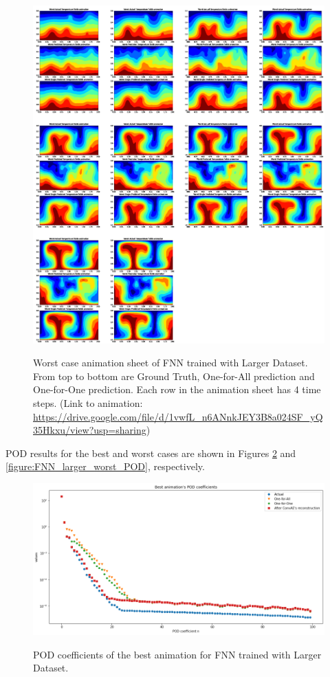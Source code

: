 \begin{figure}[H]
    \centering
    \caption{Worst case animation sheet of FNN trained with Larger Dataset. From top to bottom are Ground Truth, One-for-All prediction and One-for-One prediction. Each row in the animation sheet has 4 time steps. (Link to animation: \url{https://drive.google.com/file/d/1vwfL_n6ANnkJEY3B8a024SF_yQ35Hkxu/view?usp=sharing})}
    \includegraphics[scale=0.23]{figures/mantle_convection_images/larger_dataset/FNN_Worst_GIF_sheet.png}
    \label{figure:FNN_larger_worst_gif}
\end{figure}

POD results for the best and worst cases are shown in Figures \ref{figure:FNN_larger_best_POD} and \ref{figure:FNN_larger_worst_POD}, respectively.

\begin{figure}[H]
    \centering
    \caption{POD coefficients of the best animation for FNN trained with Larger Dataset.}
    \includegraphics[scale=0.4]{figures/mantle_convection_images/larger_dataset/FNN_Best_POD.png}
    \label{figure:FNN_larger_best_POD}
\end{figure}

